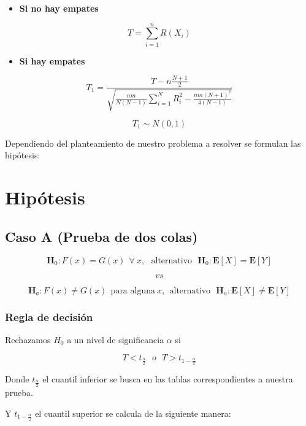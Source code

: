\documentclass[
  a4paper,
  oneside,
  openany]{book}
\providecommand{\tightlist}{%
  \setlength{\itemsep}{0pt}\setlength{\parskip}{0pt}}
\begin{document}
\begin{itemize}
\tightlist
\item
  \textbf{Si no hay empates}
\end{itemize}

\[T=\sum_{i=1}^{n}R(X_{i})\]

\begin{itemize}
\tightlist
\item
  \textbf{Si hay empates}
\end{itemize}

\[T_1= \frac{T-n\frac{N+1}{2}}{\sqrt{\frac{nm}{N(N-1)}\sum_{i=1}^{N}R_i^2-\frac{nm(N+1)^2}{4(N-1)}}}\]

\[T_{1}\sim N(0,1)\]

Dependiendo del planteamiento de nuestro problema a resolver se formulan las hipótesis:

\hypertarget{hipuxf3tesis-5}{%
\section{Hipótesis}\label{hipuxf3tesis-5}}

\hypertarget{caso-a-prueba-de-dos-colas-5}{%
\subsection*{Caso A (Prueba de dos colas)}\label{caso-a-prueba-de-dos-colas-5}}


\[\textbf{H}_0: F(x) = G(x) \ \  \forall\ x, \ \ \  \mbox{alternativo} \ \ \  \textbf{H}_0:\mathbf{E}[X] = \mathbf{E}[Y]\]

\[vs\]

\[\textbf{H}_a: F(x) \neq G(x) \ \ \mbox{para alguna} \ x,  \ \ \mbox{alternativo} \ \ \  \textbf{H}_a:
\mathbf{E}[X] \neq \mathbf{E}[Y]\]

\hypertarget{regla-de-decisiuxf3n-13}{%
\subsubsection*{Regla de decisión}\label{regla-de-decisiuxf3n-13}}


Rechazamos \(H_0\) a un nivel de significancia \(\alpha\) si

\[T < t_{\frac{\alpha}{2}} \ \ \   o \ \ \ T > t_{1-\frac{\alpha}{2}}\]

Donde \(t_\frac{\alpha}{2}\) el cuantil inferior se busca en las tablas correspondientes a nuestra prueba.

Y \(t_{1-\frac{\alpha}{2}}\) el cuantil superior se calcula de la siguiente manera:
\end{document}
